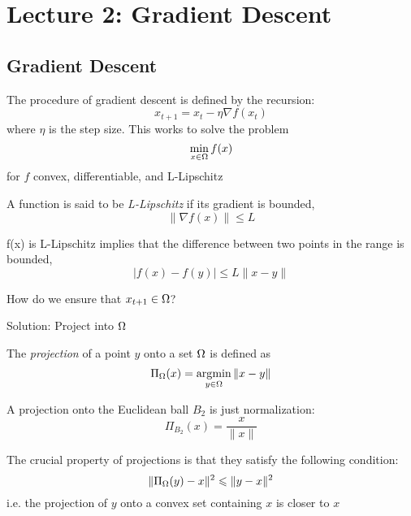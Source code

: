 \section{Lecture 2: Gradient Descent}

\subsection{Gradient Descent}


The procedure of gradient descent is defined by the recursion:
\[
x_{t+1} = x_t - \eta \nabla f(x_t)
\]
where $\eta$ is the step size. This works to solve the problem
\[
\min_{x\in\Omega} f(x)
\]
for $f$ convex, differentiable, and L-Lipschitz

\begin{definition}[L-Lipschitz]
A function is said to be \emph{L-Lipschitz} if its gradient is bounded,
\[
\|\nabla f(x)\| \leq L
\]
\end{definition}

\begin{fact}
f(x) is L-Lipschitz implies that the difference between two points in the range is bounded,
\[
|f(x) - f(y)| \leq L \|x - y\|
\]
\end{fact}


\begin{question}
How do we ensure that $x_{t+1}\in\Omega$?
\end{question}

Solution: Project into $\Omega$

\begin{definition}[Projection]
The \emph{projection} of a point $y$ onto a set $\Omega$ is defined as
\[
\Pi_{\Omega}(x) = \operatorname*{\arg\!\min}_{y\in\Omega} \|x-y\|
\]
\end{definition}

\begin{example}
A projection onto the Euclidean ball $B_2$ is just normalization:
\[
\Pi_{B_2}(x) = \dfrac{x}{\|x\|}
\]
\end{example}


The crucial property of projections is that they satisfy the following condition:
\[
\| \Pi_{\Omega}(y) - x \|^2 \leqslant \| y - x \|^2
\]
i.e. the projection of $y$ onto a convex set containing $x$ is closer to $x$

